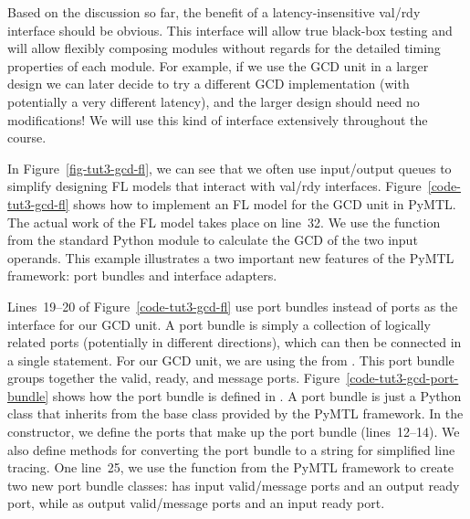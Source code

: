 \documentclass{cbxdoc}
\begin{document}
Based on the discussion so far, the benefit of a latency-insensitive
val/rdy interface should be obvious. This interface will allow true
black-box testing and will allow flexibly composing modules without
regards for the detailed timing properties of each module. For example,
if we use the GCD unit in a larger design we can later decide to try a
different GCD implementation (with potentially a very different latency),
and the larger design should need no modifications! We will use this kind
of interface extensively throughout the course.




In Figure~\ref{fig-tut3-gcd-fl}, we can see that we often use
input/output queues to simplify designing FL models that interact with
val/rdy interfaces. Figure~\ref{code-tut3-gcd-fl} shows how to implement
an FL model for the GCD unit in PyMTL. The actual work of the FL model
takes place on line~32. We use the  function from the standard
Python  module to calculate the GCD of the two input
operands. This example illustrates a two important new features of the
PyMTL framework: port bundles and interface adapters.

Lines~19--20 of Figure~\ref{code-tut3-gcd-fl} use port bundles instead of
ports as the interface for our GCD unit. A port bundle is simply a
collection of logically related ports (potentially in different
directions), which can then be connected in a single statement. For our
GCD unit, we are using the  from . This
port bundle groups together the valid, ready, and message ports.
Figure~\ref{code-tut3-gcd-port-bundle} shows how the port bundle is
defined in . A port bundle is just a Python class that inherits
from the  base class provided by the PyMTL framework. In
the constructor, we define the ports that make up the port bundle
(lines~12--14). We also define methods for converting the port bundle to
a string for simplified line tracing. One line~25, we use the
 function from the PyMTL framework to create two
new port bundle classes:  has input valid/message
ports and an output ready port, while  as output
valid/message ports and an input ready port.
\end{document}

